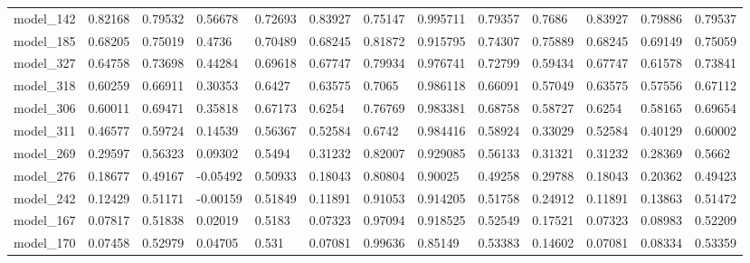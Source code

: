 \begin{tabular}{lllllllllllll}
model\_142     & 0.82168     & 0.79532        & 0.56678      & 0.72693          & 0.83927              & 0.75147              & 0.995711     & 0.79357           & 0.7686             & 0.83927         & 0.79886     & 0.79537      \\
model\_185     & 0.68205     & 0.75019        & 0.4736       & 0.70489          & 0.68245              & 0.81872              & 0.915795     & 0.74307           & 0.75889            & 0.68245         & 0.69149     & 0.75059      \\
model\_327     & 0.64758     & 0.73698        & 0.44284      & 0.69618          & 0.67747              & 0.79934              & 0.976741     & 0.72799           & 0.59434            & 0.67747         & 0.61578     & 0.73841      \\
model\_318     & 0.60259     & 0.66911        & 0.30353      & 0.6427           & 0.63575              & 0.7065               & 0.986118     & 0.66091           & 0.57049            & 0.63575         & 0.57556     & 0.67112      \\
model\_306     & 0.60011     & 0.69471        & 0.35818      & 0.67173          & 0.6254               & 0.76769              & 0.983381     & 0.68758           & 0.58727            & 0.6254          & 0.58165     & 0.69654      \\
model\_311     & 0.46577     & 0.59724        & 0.14539      & 0.56367          & 0.52584              & 0.6742               & 0.984416     & 0.58924           & 0.33029            & 0.52584         & 0.40129     & 0.60002      \\
model\_269     & 0.29597     & 0.56323        & 0.09302      & 0.5494           & 0.31232              & 0.82007              & 0.929085     & 0.56133           & 0.31321            & 0.31232         & 0.28369     & 0.5662       \\
model\_276     & 0.18677     & 0.49167        & -0.05492     & 0.50933          & 0.18043              & 0.80804              & 0.90025      & 0.49258           & 0.29788            & 0.18043         & 0.20362     & 0.49423      \\
model\_242     & 0.12429     & 0.51171        & -0.00159     & 0.51849          & 0.11891              & 0.91053              & 0.914205     & 0.51758           & 0.24912            & 0.11891         & 0.13863     & 0.51472      \\
model\_167     & 0.07817     & 0.51838        & 0.02019      & 0.5183           & 0.07323              & 0.97094              & 0.918525     & 0.52549           & 0.17521            & 0.07323         & 0.08983     & 0.52209      \\
model\_170     & 0.07458     & 0.52979        & 0.04705      & 0.531            & 0.07081              & 0.99636              & 0.85149      & 0.53383           & 0.14602            & 0.07081         & 0.08334     & 0.53359
\end{tabular}